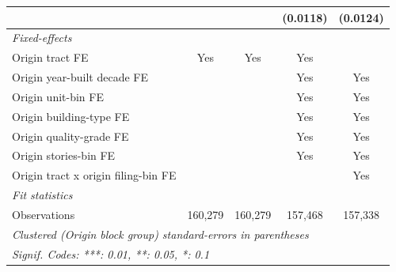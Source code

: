 \begin{tabular}{lcccc}
                                                  &                &                & (0.0118)       & (0.0124)\\   
   \midrule
   \emph{Fixed-effects}\\
   Origin tract FE                                & Yes            & Yes            & Yes            & \\  
   Origin year-built decade FE                    &                &                & Yes            & Yes\\  
   Origin unit-bin FE                             &                &                & Yes            & Yes\\  
   Origin building-type FE                        &                &                & Yes            & Yes\\  
   Origin quality-grade FE                        &                &                & Yes            & Yes\\  
   Origin stories-bin FE                          &                &                & Yes            & Yes\\  
   Origin tract x origin filing-bin FE            &                &                &                & Yes\\  
   \midrule
   \emph{Fit statistics}\\
   Observations                                   & 160,279        & 160,279        & 157,468        & 157,338\\  
   \midrule \midrule
   \multicolumn{5}{l}{\emph{Clustered (Origin block group) standard-errors in parentheses}}\\
   \multicolumn{5}{l}{\emph{Signif. Codes: ***: 0.01, **: 0.05, *: 0.1}}\\
\end{tabular}
\par\endgroup
